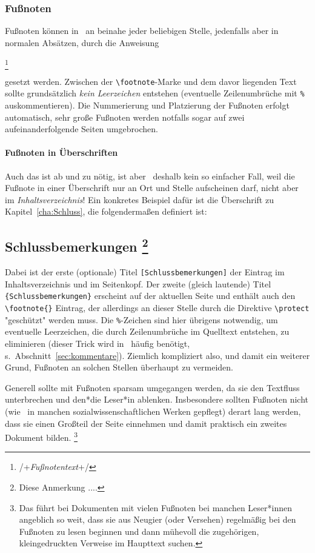 \subsection{Fußnoten}
Fußnoten können in \latex\ an beinahe jeder beliebigen Stelle, jedenfalls
aber in normalen Absätzen, durch die Anweisung
%
\begin{LaTeXCode}[numbers=none]
\footnote{/+\emph{Fußnotentext}+/}
\end{LaTeXCode}
%
gesetzt werden. Zwischen der \verb!\footnote!-Marke und dem davor liegenden
Text sollte grundsätzlich \emph{kein Leerzeichen} entstehen (eventuelle
Zeilen\-um\-brüche mit \verb!%! auskommentieren). Die Nummerierung und
Platzierung der Fußnoten erfolgt automatisch, sehr große Fußnoten werden
notfalls sogar auf zwei aufeinanderfolgende Seiten umgebrochen.

\subsubsection{Fußnoten in Überschriften}

Auch das ist ab und zu nötig, ist aber \va\ deshalb kein so einfacher Fall,
weil die Fußnote in einer Überschrift nur an Ort und Stelle aufscheinen darf,
nicht aber im \emph{Inhaltsverzeichnis}! Ein konkretes Beispiel dafür ist die
Überschrift zu Kapitel~\ref{cha:Schluss}, die folgendermaßen definiert ist:
%
\begin{LaTeXCode}[numbers=none]
\chapter[Schlussbemerkungen]%
        {Schlussbemerkungen%
        \protect\footnote{Diese Anmerkung ....}}%
\end{LaTeXCode}
%
Dabei ist der erste (optionale) Titel \verb![Schlussbemerkungen]! der Eintrag
im Inhaltsverzeichnis und im Seitenkopf. Der zweite (gleich lautende) Titel
\texttt{\{Schlussbemerkungen\}} erscheint auf der aktuellen Seite und enthält
auch den \verb!\footnote{}! Eintrag, der allerdings an dieser Stelle durch
die Direktive \verb!\protect! "geschützt" werden muss. Die \verb!%!-Zeichen
sind hier übrigens notwendig, um eventuelle Leerzeichen, die durch
Zeilenumbrüche im Quelltext entstehen, zu eliminieren (dieser Trick wird in
\latex\ häufig benötigt, s.\ Abschnitt~\ref{sec:kommentare}). Ziemlich
kompliziert also, und damit ein weiterer Grund, Fußnoten an solchen Stellen
überhaupt zu vermeiden.

Generell sollte mit Fußnoten sparsam umgegangen werden, da sie den Textfluss
unterbrechen und den*die Leser*in ablenken. Insbesondere sollten Fußnoten
nicht (wie \va\ in manchen sozialwissenschaftlichen Werken gepflegt) derart
lang werden, dass sie einen Großteil der Seite einnehmen und damit praktisch
ein zweites Dokument bilden.%
\footnote{Das führt bei Dokumenten mit vielen Fußnoten bei manchen
Leser*innen angeblich so weit, dass sie aus Neugier (oder Versehen)
    regelmäßig bei den Fußnoten zu lesen beginnen und dann mühevoll die
    zugehörigen, kleingedruckten Verweise im Haupttext suchen.}

